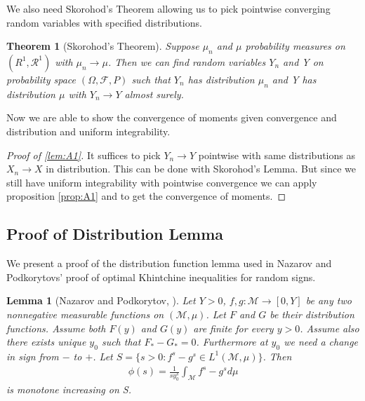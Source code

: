 \documentclass[10pt]{article}
\newcommand{\1}{\textbf{1}}
\newtheorem{theorem}{Theorem}[subsection]
\newtheorem{lemma}{Lemma}[subsection]
\theoremstyle{remark}
\theoremstyle{definition}
\begin{document}
We also need Skorohod's Theorem allowing us to pick pointwise converging random variables with specified distributions.

\begin{theorem}[Skorohod's Theorem]\label{thm:A1}
	Suppose $\mu_n$ and $\mu$ probability measures on $(R^1,\mathcal{R}^1)$ with $\mu_n \to \mu$. Then we can find random variables $Y_n$ and Y on probability space $(\Omega,\mathcal{F},P)$ such that $Y_n$ has distribution $\mu_n$ and Y has distribution $\mu$ with $Y_n \to Y$ almost surely.
\end{theorem}

Now we are able to show the convergence of moments given convergence and distribution and uniform integrability.

\begin{proof}[Proof of \ref{lem:A1}]
	It suffices to pick $Y_n \to Y$ pointwise with same distributions as $X_n \to X$ in distribution. This can be done with Skorohod's Lemma. But since we still have uniform integrability with pointwise convergence we can apply proposition \ref{prop:A1} and to get the convergence of moments. 
\end{proof}

\subsection{Proof of Distribution Lemma}

We present a proof of the distribution function lemma used in Nazarov and Podkorytovs' proof of optimal Khintchine inequalities for random signs.

\begin{lemma}[Nazarov and Podkorytov, \cite{NP}]\label{lem:A.2.1}
	Let $Y > 0$, $f,g : \mathcal{M} \to [0,Y]$ be any two nonnegative measurable functions on $(\mathcal{M},\mu)$. Let $F$ and $G$ be their distribution functions. Assume both $F(y)$ and $G(y)$ are finite for every $y > 0$. Assume also  there exists unique $y_0$ such that $F_*-G_* = 0$. Furthermore at $y_0$ we need a change in sign from $-$ to $+$. Let $S = \{s > 0: f^s - g^s \in L^1(\mathcal{M},\mu)\}$. Then
	\begin{align*}
		\phi(s) = \frac{1}{sy_0^s}\int_{\mathcal{M}}f^s - g^s d\mu
	\end{align*}
	is monotone increasing on S. 
\end{lemma}
\end{document}
